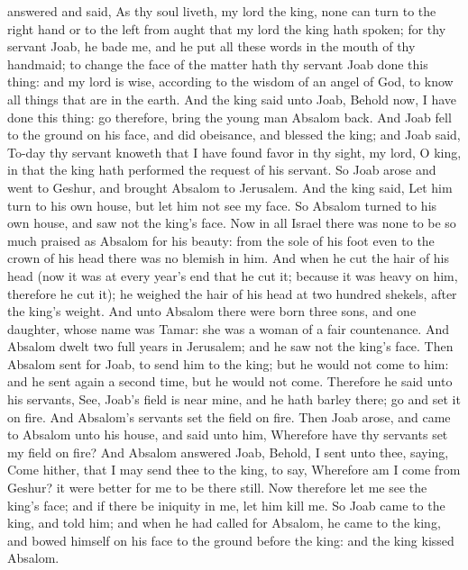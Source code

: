 answered and said, As thy soul liveth, my lord the king, none can turn to the right hand or to the left from aught that my lord the king hath spoken; for thy servant Joab, he bade me, and he put all these words in the mouth of thy handmaid; to change the face of the matter hath thy servant Joab done this thing: and my lord is wise, according to the wisdom of an angel of God, to know all things that are in the earth.  And the king said unto Joab, Behold now, I have done this thing: go therefore, bring the young man Absalom back. And Joab fell to the ground on his face, and did obeisance, and blessed the king; and Joab said, To-day thy servant knoweth that I have found favor in thy sight, my lord, O king, in that the king hath performed the request of his servant. So Joab arose and went to Geshur, and brought Absalom to Jerusalem. And the king said, Let him turn to his own house, but let him not see my face. So Absalom turned to his own house, and saw not the king’s face.  Now in all Israel there was none to be so much praised as Absalom for his beauty: from the sole of his foot even to the crown of his head there was no blemish in him. And when he cut the hair of his head (now it was at every year’s end that he cut it; because it was heavy on him, therefore he cut it); he weighed the hair of his head at two hundred shekels, after the king’s weight. And unto Absalom there were born three sons, and one daughter, whose name was Tamar: she was a woman of a fair countenance.  And Absalom dwelt two full years in Jerusalem; and he saw not the king’s face. Then Absalom sent for Joab, to send him to the king; but he would not come to him: and he sent again a second time, but he would not come. Therefore he said unto his servants, See, Joab’s field is near mine, and he hath barley there; go and set it on fire. And Absalom’s servants set the field on fire. Then Joab arose, and came to Absalom unto his house, and said unto him, Wherefore have thy servants set my field on fire? And Absalom answered Joab, Behold, I sent unto thee, saying, Come hither, that I may send thee to the king, to say, Wherefore am I come from Geshur? it were better for me to be there still. Now therefore let me see the king’s face; and if there be iniquity in me, let him kill me. So Joab came to the king, and told him; and when he had called for Absalom, he came to the king, and bowed himself on his face to the ground before the king: and the king kissed Absalom. 

